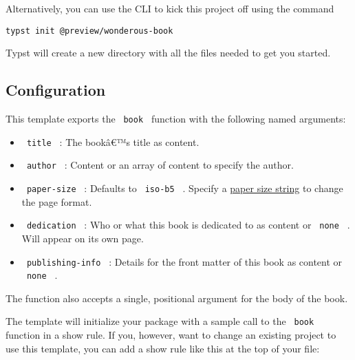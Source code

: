 Alternatively, you can use the CLI to kick this project off using the
command

\begin{verbatim}
typst init @preview/wonderous-book
\end{verbatim}

Typst will create a new directory with all the files needed to get you
started.

\subsection{Configuration}\label{configuration}

This template exports the \texttt{\ book\ } function with the following
named arguments:

\begin{itemize}
\tightlist
\item
  \texttt{\ title\ } : The bookâ€™s title as content.
\item
  \texttt{\ author\ } : Content or an array of content to specify the
  author.
\item
  \texttt{\ paper-size\ } : Defaults to \texttt{\ iso-b5\ } . Specify a
  \href{https://typst.app/docs/reference/layout/page/\#parameters-paper}{paper
  size string} to change the page format.
\item
  \texttt{\ dedication\ } : Who or what this book is dedicated to as
  content or \texttt{\ none\ } . Will appear on its own page.
\item
  \texttt{\ publishing-info\ } : Details for the front matter of this
  book as content or \texttt{\ none\ } .
\end{itemize}

The function also accepts a single, positional argument for the body of
the book.

The template will initialize your package with a sample call to the
\texttt{\ book\ } function in a show rule. If you, however, want to
change an existing project to use this template, you can add a show rule
like this at the top of your file:

\begin{Shaded}
\begin{Highlighting}[]

\NormalTok{  publishing{-}info: [}


\NormalTok{  ],}
\NormalTok{)}

\end{Highlighting}
\end{Shaded}

